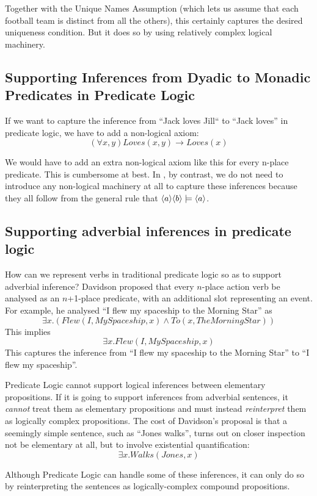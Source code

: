\NI Together with the Unique Names Assumption (which lets us assume
that each football team is distinct from all the others), this
certainly captures the desired uniqueness condition.  But it does so
by using relatively complex logical machinery.

\subsection{Supporting Inferences from Dyadic to Monadic Predicates in Predicate Logic}
If we want to capture the inference from ``Jack loves Jill`` to ``Jack loves'' in predicate logic, we have to add a non-logical axiom:
\[
(\forall x, y) Loves(x,y) \rightarrow Loves(x)
\]

\NI We would have to add an extra non-logical axiom like this for every
n-place predicate.  This is cumbersome at best.  In \ELABR{}, by
contrast, we do not need to introduce any non-logical machinery at all
to capture these inferences because they all follow from the general
rule that $\MAY{a} \MAY{b} \models \MAY{a}$.

\subsection{Supporting adverbial inferences in predicate logic}

\NI How can we represent verbs in traditional predicate logic so as to
support adverbial inference?  Davidson \cite{davidson2} proposed that
every $n$-place action verb be analysed as an $n$+1-place predicate,
with an additional slot representing an event.  For example, he
analysed ``I flew my spaceship to the Morning Star'' as
\[
\exists x. ( Flew(I, MySpaceship, x) \land To(x, TheMorningStar))
\]
This implies 
\[
\exists x.  Flew(I, MySpaceship, x)
\]
This captures the inference from ``I flew my spaceship to the Morning Star'' to ``I flew my spaceship''.

Predicate Logic cannot support logical inferences between elementary propositions. 
If it is going to support inferences from adverbial sentences, it \emph{cannot} treat them as elementary propositions and must instead \emph{reinterpret} them as logically complex propositions.
The cost of Davidson's proposal is that a seemingly simple sentence, such as ``Jones walks'', turns out on closer inspection not be elementary at all,  but to involve existential quantification:
\[
\exists x.  Walks(Jones, x)
\]

\NI Although Predicate Logic can handle some of these inferences, it
can only do so by reinterpreting the sentences as logically-complex
compound propositions.

